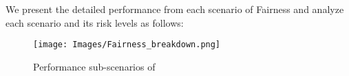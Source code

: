 We present the detailed performance from each scenario of Fairness and analyze each scenario and its risk levels as follows:
\begin{figure*}[h]
    \centering
    \texttt{[image: Images/Fairness\_breakdown.png]}
    \vspace{-0.5in}
    \caption{Performance sub-scenarios of \llm}
\label{fig:fairness-radar}
\end{figure*} 